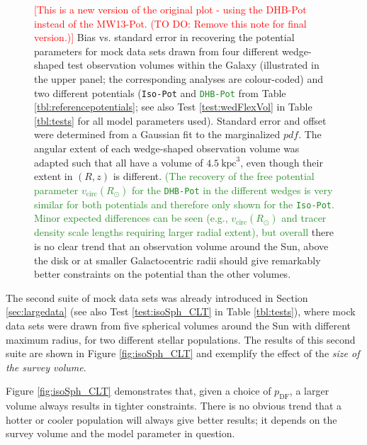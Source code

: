 \documentclass[iop,revtex4]{emulateapj}
\newcommand{\pdf}{\ensuremath{pdf}}
\newcommand{\NEW}[1]{\textcolor{ForestGreen}{#1}}
\newcommand{\NOTE}[1]{\textcolor{Red}{#1}}
\newcommand{\OLD}[1]{}
\begin{document}
\begin{figure}[!htbp]
\caption{\NOTE{[This is a new version of the original plot - using the DHB-Pot instead of the MW13-Pot. (TO DO: Remove this note for final version.)]} Bias vs. standard error in recovering the potential parameters for mock data sets drawn from four different wedge-shaped test observation volumes within the Galaxy (illustrated in the upper panel; the corresponding analyses are colour-coded) and two different potentials (\texttt{Iso-Pot} and \OLD{\texttt{MW13-Pot}}\NEW{\texttt{DHB-Pot}} from Table \ref{tbl:referencepotentials}; see also Test \ref{test:wedFlexVol} in Table \ref{tbl:tests} for all model parameters used). Standard error and offset were determined from a Gaussian fit to the marginalized \pdf{}. The angular extent of each wedge-shaped observation volume was adapted such that all have a volume of $4.5~\text{kpc}^3$, even though their extent in $(R,z)$ is different. \NEW{(The recovery of the free potential parameter $v_\text{circ}(R_\odot)$ for the \texttt{DHB-Pot} in the different wedges is very similar for both potentials and therefore only shown for the \texttt{Iso-Pot}. Minor expected differences can be seen (e.g., $v_\text{circ}(R_\odot)$ and tracer density scale lengths requiring larger radial extent), but overall}\OLD{Overall} there is no clear trend that an observation volume around the Sun, above the disk or at smaller Galactocentric radii should give remarkably better constraints on the potential than the other volumes.}
\label{fig:wedFlexVol_bias_vs_SE}
\end{figure}

The second suite of mock data sets was already introduced in Section \ref{sec:largedata} (see also Test \ref{test:isoSph_CLT} in Table \ref{tbl:tests}), where mock data sets were drawn from five spherical volumes around the Sun with different maximum radius, for two different stellar populations. The results of this second suite are shown in Figure \ref{fig:isoSph_CLT} and exemplify the effect of the {\it size of the survey volume}.

Figure \ref{fig:isoSph_CLT} demonstrates that, given a choice of $p_\text{DF}$, a larger volume always results in tighter constraints. There is no obvious trend that a hotter or cooler population will always give better results; it depends on the survey volume and the model parameter in question.
\end{document}
